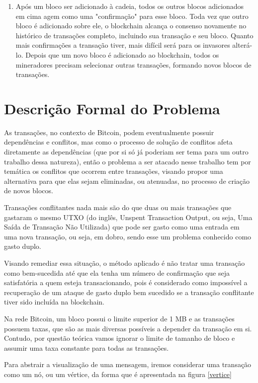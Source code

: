 \documentclass[conference]{IEEEtran}
\begin{document}
\begin{enumerate}
    \item Após um bloco ser adicionado à cadeia, todos os outros blocos adicionados em cima agem como uma "confirmação" para esse bloco. Toda vez que outro bloco é adicionado sobre ele, o blockchain alcança o consenso novamente no histórico de transações completo, incluindo sua transação e seu bloco. Quanto mais confirmações a transação tiver, mais difícil será para os invasores alterá-lo. Depois que um novo bloco é adicionado ao blockchain, todos os mineradores precisam selecionar outras transações, formando novos blocos de transações.
\end{enumerate}


\section{Descrição Formal do Problema}
\label{subsec:descricao_formal_do_problema}

As transações, no contexto de Bitcoin, podem eventualmente possuir dependências e  conflitos, mas como o processo de solução de conflitos afeta diretamente as dependências (que por si só já poderiam ser tema para um outro trabalho dessa natureza), então o problema a ser atacado nesse trabalho tem por temática os conflitos que ocorrem entre transações, visando propor uma alternativa para que elas sejam eliminadas, ou atenuadas, no processo de criação de novos blocos.

Transações conflitantes nada mais são do que duas ou mais transações que gastaram o mesmo UTXO (do inglês, Unspent Transaction Output, ou seja, Uma Saída de Transação Não Utilizada) que pode ser gasto como uma entrada em uma nova transação, ou seja, em dobro, sendo esse um problema conhecido como gasto duplo. 

Visando remediar essa situação, o método aplicado é não tratar uma transação como bem-sucedida até que ela tenha um número de confirmação que seja satisfatória a quem esteja transacionando, pois é considerado como impossível a recuperação de um ataque de gasto duplo bem sucedido se a transação conflitante tiver sido incluída na blockchain.

Na rede Bitcoin, um bloco possui o limite superior de 1 MB e as transações possuem taxas, que são as mais diversas possíveis a depender da transação em si. Contudo, por questão teórica vamos ignorar o limite de tamanho de bloco e assumir uma taxa constante para todas as transações.

Para abstrair a visualização de uma mensagem, iremos considerar uma transação como um nó, ou um vértice, da forma que é apresentada na figura \ref{vertice}
\end{document}
